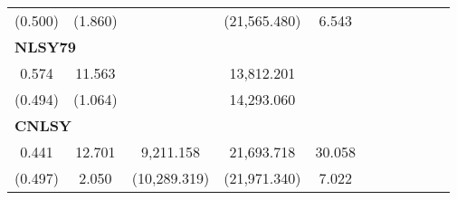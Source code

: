 \begin{tabular}{ccccccccccc}
    (0.500) &     (1.860) &      & (21,565.480) &     6.543 &         &         &         &         &          \\  
\multicolumn{10}{l}{\textbf{NLSY79}} \\    
    0.574 &    11.563 &   & 13,812.201 &  &         &         &         &         &          \\  
    (0.494) &     (1.064) &   & 14,293.060 & &         &         &         &         &         \\  
\multicolumn{10}{l}{\textbf{CNLSY}} \\
    0.441 &    12.701 &  9,211.158 & 21,693.718 &    30.058 &         &         &         &         &         \\  
    (0.497) &     2.050 & (10,289.319) & (21,971.340) &     7.022 &         &         &         &         &          \\ \bottomrule \end{tabular}

